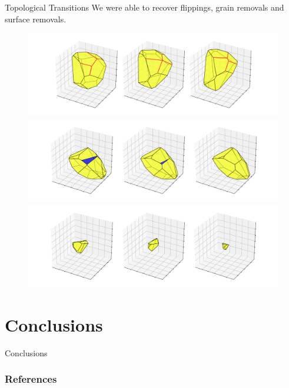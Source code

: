 \documentclass[usenames,dvipsnames]{beamer}
\begin{document}
\begin{frame}{Topological Transitions}
We were able to recover flippings, grain removals and surface removals.
\vspace{-0.2em}
\begin{figure}
    \centering
    \includegraphics[scale=0.2]{figures/3d_voronoi/3D_flipping.pdf}\\
    \includegraphics[scale=0.2]{figures/3d_voronoi/3D_surface_removal.pdf}\\
    \includegraphics[scale=0.2]{figures/3d_voronoi/3D_grain_removal.pdf}
\end{figure}
\end{frame}

\section{Conclusions}
\begin{frame}{Conclusions}
    
\end{frame}

\appendix
\begin{frame}[allowframebreaks]
    \frametitle{References}
    
    
\end{frame}
\end{document}
